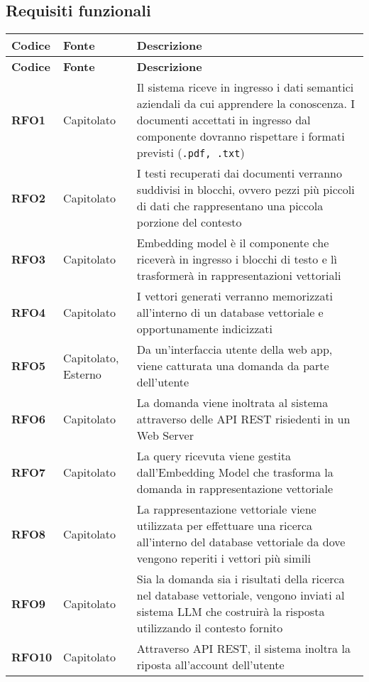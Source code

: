 \subsection{Requisiti funzionali}
\begin{longtable}{|>{\centering\arraybackslash}m{}|>{\centering\arraybackslash}m{}|>{\arraybackslash}m{}|}
	\hline
	\textbf{Codice} & \textbf{Fonte} & \textbf{Descrizione}\\\hline
	\endfirsthead
	\hline
	\textbf{Codice} & \textbf{Fonte} & \textbf{Descrizione}\\\hline
	\endhead
	\hline
	\textbf{RFO1}            & Capitolato    & Il sistema riceve in ingresso i dati semantici aziendali da cui apprendere la conoscenza. I documenti accettati in ingresso dal componente dovranno rispettare i formati previsti (\texttt{.pdf, .txt}) \\
	\hline
	\textbf{RFO2} & Capitolato & I testi recuperati dai documenti verranno suddivisi in blocchi, ovvero pezzi più piccoli di dati che rappresentano una piccola porzione del contesto\\
	\hline
	\textbf{RFO3} & Capitolato & Embedding model è il componente che riceverà in ingresso i blocchi di testo e lì trasformerà in rappresentazioni vettoriali\\
	\hline
	\textbf{RFO4} & Capitolato & I vettori generati verranno memorizzati all’interno di un database vettoriale e opportunamente indicizzati\\
	\hline
	\textbf{RFO5} & Capitolato, Esterno & Da un’interfaccia utente della web app, viene catturata una domanda da parte dell’utente\\
	\hline
	\textbf{RFO6} & Capitolato & La domanda viene inoltrata al sistema attraverso delle API REST risiedenti in un Web Server\\
	\hline
	\textbf{RFO7} & Capitolato & La query ricevuta viene gestita dall’Embedding Model che trasforma la domanda in rappresentazione vettoriale \\
	\hline
	\textbf{RFO8} & Capitolato & La rappresentazione vettoriale viene utilizzata per effettuare una ricerca all’interno del database vettoriale da dove vengono reperiti i vettori più simili\\
	\hline
	\textbf{RFO9} & Capitolato & Sia la domanda sia i risultati della ricerca nel database vettoriale, vengono inviati al sistema LLM che costruirà la risposta utilizzando il contesto fornito\\
	\hline
	\textbf{RFO10} & Capitolato & Attraverso API REST, il sistema inoltra la riposta all'account dell’utente\\

\end{longtable}
